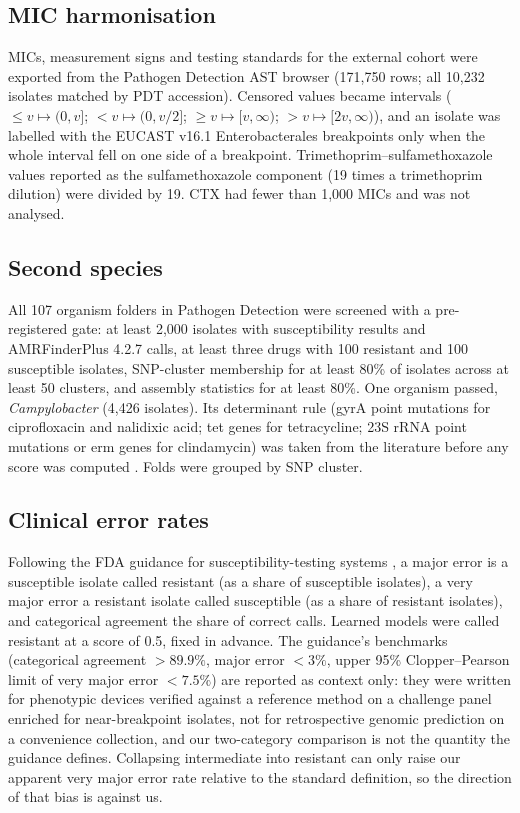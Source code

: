 \subsection*{MIC harmonisation}
MICs, measurement signs and testing standards for the external cohort were exported from the
Pathogen Detection AST browser (171,750 rows; all 10,232 isolates matched by PDT accession).
Censored values became intervals ($\le v \mapsto (0, v]$; $< v \mapsto (0, v/2]$;
$\ge v \mapsto [v, \infty)$; $> v \mapsto [2v, \infty)$), and an isolate was labelled with the
EUCAST v16.1 Enterobacterales breakpoints \cite{eucast2026v161} only when the whole interval fell
on one side of a breakpoint. Trimethoprim--sulfamethoxazole values reported as the sulfamethoxazole
component (19 times a trimethoprim dilution) were divided by 19. CTX had fewer than 1,000 MICs and
was not analysed.

\subsection*{Second species}
All 107 organism folders in Pathogen Detection were screened with a pre-registered gate: at least
2,000 isolates with susceptibility results and AMRFinderPlus 4.2.7 calls, at least three drugs with
100 resistant and 100 susceptible isolates, SNP-cluster membership for at least 80\% of isolates
across at least 50 clusters, and assembly statistics for at least 80\%. One organism passed,
\textit{Campylobacter} (4,426 isolates). Its determinant rule (gyrA point mutations for
ciprofloxacin and nalidixic acid; tet genes for tetracycline; 23S rRNA point mutations or erm genes
for clindamycin) was taken from the literature before any score was computed
\cite{zhao2016campylobacter,iovine2013campylobacter}. Folds were grouped by SNP cluster.

\subsection*{Clinical error rates}
Following the FDA guidance for susceptibility-testing systems \cite{fda2009ast}, a major error is a
susceptible isolate called resistant (as a share of susceptible isolates), a very major error a
resistant isolate called susceptible (as a share of resistant isolates), and categorical agreement
the share of correct calls. Learned models were called resistant at a score of 0.5, fixed in
advance. The guidance's benchmarks (categorical agreement $> 89.9\%$, major error $< 3\%$, upper
95\% Clopper--Pearson limit of very major error $< 7.5\%$) are reported as context only: they were
written for phenotypic devices verified against a reference method on a challenge panel enriched
for near-breakpoint isolates, not for retrospective genomic prediction on a convenience collection,
and our two-category comparison is not the quantity the guidance defines. Collapsing intermediate
into resistant can only raise our apparent very major error rate relative to the standard
definition, so the direction of that bias is against us.

